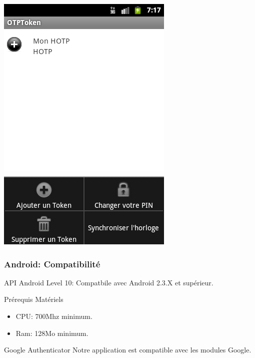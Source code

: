 \documentclass[xcolor=table]{beamer}
\begin{document}
\begin{frame}
\includegraphics[scale=0.33]{../graphics/menu.png}
\end{frame}

\begin{frame}
\frametitle{Android: Compatibilité}
\begin{block}{API Android}
Level 10: Compatbile avec Android 2.3.X et supérieur.
\end{block}
\begin{block}{Prérequis Matériels}
\begin{itemize}
\item CPU: 700Mhz minimum.
\item Ram: 128Mo minimum.
\end{itemize}
\end{block}
\begin{block}{Google Authenticator}
Notre application est compatible avec les modules Google.
\end{block}
\end{frame}
\end{document}
